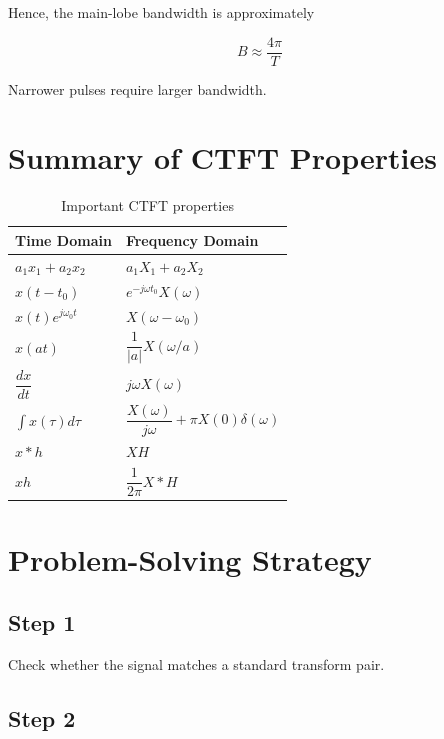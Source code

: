Hence, the main-lobe bandwidth is approximately

\[
\boxed{
B\approx\frac{4\pi}{T}
}
\]

Narrower pulses require larger bandwidth.


\section{Summary of CTFT Properties}

\begin{table}[H]
\centering
\caption{Important CTFT properties}
\begin{tabular}{|p{5cm}|p{6cm}|}
\hline
\textbf{Time Domain} & \textbf{Frequency Domain} \\
\hline
\(a_1x_1+a_2x_2\) & \(a_1X_1+a_2X_2\) \\
\hline
\(x(t-t_0)\) & \(e^{-j\omega t_0}X(\omega)\) \\
\hline
\(x(t)e^{j\omega_0 t}\) & \(X(\omega-\omega_0)\) \\
\hline
\(x(at)\) & \(\dfrac{1}{|a|}X(\omega/a)\) \\
\hline
\(\dfrac{dx}{dt}\) & \(j\omega X(\omega)\) \\
\hline
\(\int x(\tau)d\tau\) & \(\dfrac{X(\omega)}{j\omega}+\pi X(0)\delta(\omega)\) \\
\hline
\(x*h\) & \(XH\) \\
\hline
\(xh\) & \(\dfrac{1}{2\pi}X*H\) \\
\hline
\end{tabular}
\end{table}


\section{Problem-Solving Strategy}

\subsection{Step 1}

Check whether the signal matches a standard transform pair.


\subsection{Step 2}

